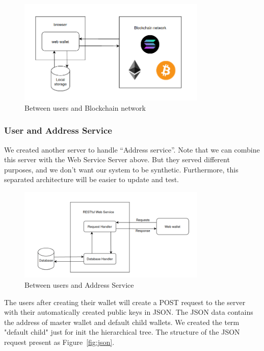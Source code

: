 \begin{figure}[ht!]
    \centering
    \includegraphics[width=0.8\textwidth]{images/design_ubl.png}
    \caption[Between users and Blockchain network]{Between users and Blockchain network}
    \label{fig:ubl}
\end{figure}

\subsubsection{User and Address Service}

We created another server to handle “Address service”. Note that we can combine this server with the Web Service Server above. But they served different purposes, and we don’t want our system to be synthetic. Furthermore, this separated architecture will be easier to update and test.

\begin{figure}[ht!]
    \centering
    \includegraphics[width=0.8\textwidth]{images/design_uas.png}
    \caption[Between users and Address Service]{Between users and Address Service}
    \label{fig:uas}
\end{figure}

The users after creating their wallet will create a POST request to the server with their automatically created public keys in JSON.
The JSON data contains the address of master wallet and default child wallets.
We created the term "default child" just for init the hierarchical tree.
The structure of the JSON request present as Figure~\ref{fig:json}.

